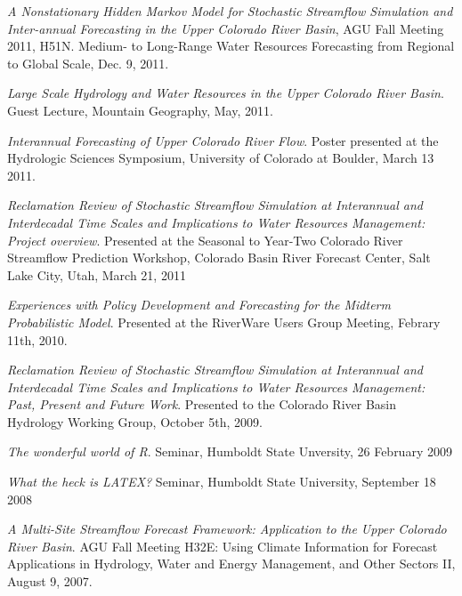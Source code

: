 \documentclass[10pt,a4paper]{scrartcl}
\begin{document}
\begin{cv}{}
        \begin{cvlist}{}\label{pres}
        	\item {\it A Nonstationary Hidden Markov Model for Stochastic Streamflow Simulation and Inter-annual Forecasting in the Upper Colorado River Basin}, AGU Fall Meeting 2011, H51N. Medium- to Long-Range Water Resources Forecasting from Regional to Global Scale, Dec. 9, 2011.
            \item \textit{Large Scale Hydrology and Water Resources in the Upper Colorado River Basin}. Guest Lecture, Mountain Geography, May, 2011.
            \item \textit{Interannual Forecasting of Upper Colorado River Flow}. Poster presented at the Hydrologic Sciences Symposium, University of Colorado at Boulder, March 13 2011. 
            \item \textit{Reclamation Review of Stochastic Streamflow Simulation at Interannual and Interdecadal Time Scales and Implications to Water Resources Management: Project overview}. Presented at the Seasonal to Year-Two Colorado River Streamflow Prediction Workshop, Colorado Basin River Forecast Center, Salt Lake City, Utah, March 21, 2011
            \item \textit{Experiences with Policy Development and Forecasting for the Midterm Probabilistic Model}. Presented at the RiverWare Users Group Meeting, Febrary 11th, 2010. 
            \item \textit{Reclamation Review of Stochastic Streamflow Simulation at Interannual and Interdecadal Time Scales and Implications to Water Resources Management: Past, Present and Future Work}. Presented to the Colorado River Basin Hydrology Working Group, October 5th, 2009. 
            \item \textit{The wonderful world of R}. Seminar, Humboldt State Unversity, 26 February 2009
            \item \textit{What the heck is LATEX?} Seminar, Humboldt State University, September 18 2008
            \item \textit{A Multi-Site Streamflow Forecast Framework: Application to the Upper Colorado River Basin}. AGU Fall Meeting H32E: Using Climate Information for Forecast Applications in Hydrology, Water and Energy Management, and Other Sectors II, August 9, 2007.
        \end{cvlist}
    \end{cv}
\end{document}
